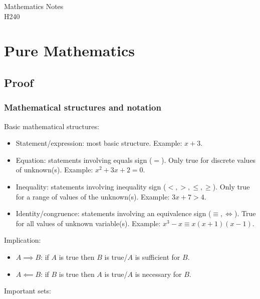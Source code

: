\documentclass[a4paper]{report}
\begin{document}
\begin{titlepage}
	\raggedleft
	\vspace*{2cm}
	\Huge{Mathematics Notes}\\
	\vspace{0.5cm}
	\large{H240}
\end{titlepage}

\tableofcontents

\part{Pure Mathematics}

\chapter{Proof}

\section{Mathematical structures and notation}

Basic mathematical structures:

\begin{itemize}
	\item{Statement/expression: most basic structure. Example: \( x + 3 \).}
	\item{Equation: statements involving equals sign (\( = \)). Only true for discrete values
		of unknown(s). Example: \( x^2 + 3x + 2 = 0 \).}
	\item{Inequality: statements involving inequality sign (\( <, >, \leq, \geq \)). Only true
		for a range of values of the unknown(s). Example: \( 3x + 7 > 4 \).}
	\item{Identity/congruence: statements involving an equivalence sign (\( \equiv, \iff \)).
		True for all values of unknown variable(s). Example:
		\( x^3 - x \equiv x(x + 1)(x - 1) \).}
\end{itemize}

Implication:

\begin{itemize}
	\item{\( A \implies B \): if \( A \) is true then \( B \) is true/\( A \) is sufficient
		for \( B \).}
	\item{\( A \impliedby B \): if \( B \) is true then \( A \) is true/\( A \) is necessary
		for \( B \).}
\end{itemize}

Important sets:
\end{document}

